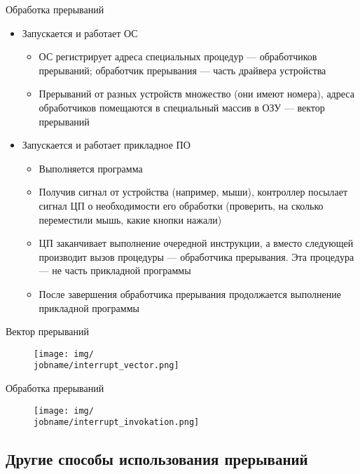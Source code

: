 \documentclass[xetex,aspectratio=43]{beamer}
\begin{document}
\begin{frame}{Обработка прерываний}
	\begin{itemize}
		\tightlist
		\item
		Запускается и работает ОС

		\begin{itemize}
			\tightlist
			\item
			ОС регистрирует адреса специальных процедур --- обработчиков
			прерываний; обработчик прерывания --- часть драйвера устройства
			\item
			Прерываний от разных устройств множество (они имеют номера), адреса
			обработчиков помещаются в специальный массив в ОЗУ --- вектор
			прерываний
		\end{itemize}
		\item
		Запускается и работает прикладное ПО

		\begin{itemize}
			\tightlist
			\item
			Выполняется программа
			\item
			Получив сигнал от устройства (например, мыши), контроллер посылает
			сигнал ЦП о необходимости его обработки (проверить, на сколько
			переместили мышь, какие кнопки нажали)
			\item
			ЦП заканчивает выполнение очередной инструкции, а вместо следующей
			производит вызов процедуры --- обработчика прерывания. Эта процедура
			--- не часть прикладной программы
			\item
			После завершения обработчика прерывания продолжается выполнение
			прикладной программы
		\end{itemize}
	\end{itemize}
\end{frame}

\begin{frame}{Вектор прерываний}
	\begin{figure}
		\texttt{[image: img/\\jobname/interrupt\_vector.png]}
	\end{figure}
\end{frame}

\begin{frame}{Обработка прерываний}
	\begin{figure}
		\texttt{[image: img/\\jobname/interrupt\_invokation.png]}
	\end{figure}
\end{frame}

\subsection{Другие способы использования прерываний}
\end{document}
